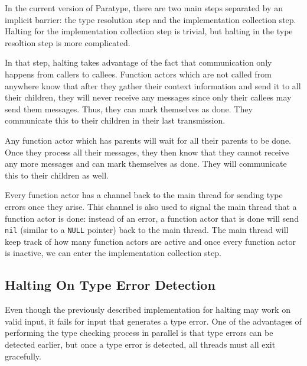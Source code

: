 \documentclass{acm_proc_article-sp}
\begin{document}
		In the current version of Paratype, there are two main steps separated
		by an implicit barrier: the type resolution step and the implementation
		collection step. Halting for the implementation collection step is
		trivial, but halting in the type resoltion step is more complicated. 
		
		In that step, halting takes advantage of the fact
		that communication only happens from callers to callees. Function
		actors which are not called from anywhere know that after they gather
		their context information and send it to all their children, they will
		never receive any messages since only their callees may send them
		messages. Thus, they can mark themselves as done. They communicate this
		to their children in their last transmission.

		Any function actor which has parents will wait for all their parents to
		be done. Once they process all their messages, they then know that they
		cannot receive any more messages and can mark themselves as done. They
		will communicate this to their children as well.

		Every function actor has a channel back to the main thread for sending
		type errors once they arise. This channel is also used to signal the
		main thread that a function actor is done: instead of an error, a
		function actor that is done will send \lstinline!nil! (similar to a
		\lstinline!NULL! pointer) back to the main thread. The main thread will
		keep track of how many function actors are active and once every
		function actor is inactive, we can enter the implementation collection
		step.

	\subsection{Halting On Type Error Detection}
		\label{subsec:errorhalting}

		Even though the previously described implementation for halting may
		work on valid input, it fails for input that generates a type error.
		One of the advantages of performing the type checking process in
		parallel is that type errors can be detected earlier, but once a type
		error is detected, all threads must all exit gracefully. 
\end{document}
